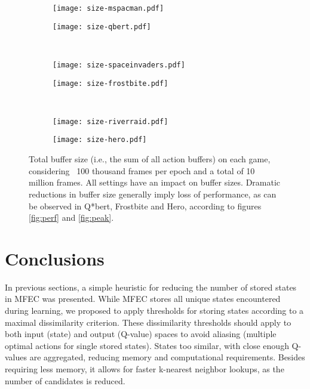 \documentclass{article}
\begin{document}
\begin{figure}[htb]
    \centering
    \begin{subfigure}{.49\textwidth}
        \centering
        \texttt{[image: size-mspacman.pdf]}
        \label{fig:size-mspacman}
    \end{subfigure}
    \begin{subfigure}{.49\textwidth}
        \centering
        \texttt{[image: size-qbert.pdf]}
        \label{fig:size-qbert}
    \end{subfigure}\\[-6.4ex]
    \begin{subfigure}{.49\textwidth}
        \centering
        \texttt{[image: size-spaceinvaders.pdf]}
        \label{fig:size-spaceinvaders}
    \end{subfigure}
    \begin{subfigure}{.49\textwidth}
        \centering
        \texttt{[image: size-frostbite.pdf]}
        \label{fig:size-frostbite}
    \end{subfigure}\\[-6.4ex]
    \begin{subfigure}{.49\textwidth}
        \centering
        \texttt{[image: size-riverraid.pdf]}
        \label{fig:size-riverraid}
    \end{subfigure}
    \begin{subfigure}{.49\textwidth}
        \centering
        \texttt{[image: size-hero.pdf]}
        \label{fig:size-hero}
    \end{subfigure}\vspace{-1.5\baselineskip}
    
    \caption{Total buffer size (i.e., the sum of all action buffers) on each game, considering ~100 thousand frames per epoch and a total of 10 million frames. All settings have an impact on buffer sizes. Dramatic reductions in buffer size generally imply loss of performance, as can be observed in Q*bert, Frostbite and Hero, according to figures \ref{fig:perf} and \ref{fig:peak}.}
    \label{fig:size}
\end{figure}


\section{Conclusions}
\label{sec:conclusions}

In previous sections, a simple heuristic for reducing the number of stored states in MFEC was presented. While MFEC stores all unique states encountered during learning, we proposed to apply thresholds for storing states according to a maximal dissimilarity criterion. These dissimilarity thresholds should apply to both input (state) and output (Q-value) spaces to avoid aliasing (multiple optimal actions for single stored states). States too similar, with close enough Q-values are aggregated, reducing memory and computational requirements. Besides requiring less memory, it allows for faster k-nearest neighbor lookups, as the number of candidates is reduced.
\end{document}
